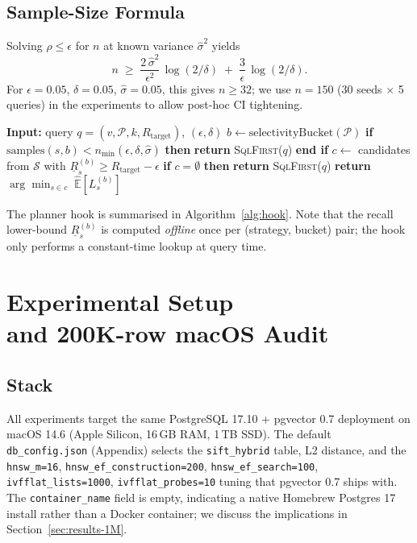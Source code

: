 \documentclass[conference]{IEEEtran}
\begin{document}
\subsection{Sample-Size Formula}
Solving $\rho \leq \epsilon$ for $n$ at known variance $\hat\sigma^2$
yields
\begin{equation}
  n \;\geq\; \frac{2\,\hat\sigma^2}{\epsilon^2}\,\log(2/\delta)
  \;+\; \frac{3}{\epsilon}\,\log(2/\delta).
  \label{eq:n}
\end{equation}
For $\epsilon = 0.05$, $\delta = 0.05$, $\hat\sigma = 0.05$, this
gives $n \geq 32$; we use $n = 150$ (30 seeds $\times$ 5 queries) in
the experiments to allow post-hoc CI tightening.

\begin{algorithm}[t]
\caption{PAC-Recall Planner Hook}
\label{alg:hook}
\begin{algorithmic}[1]
\STATE \textbf{Input:} query $q = (v, \mathcal{P}, k, R_{\text{target}})$, $(\epsilon, \delta)$
\STATE $b \gets \text{selectivityBucket}(\mathcal{P})$
\STATE \textbf{if} $\text{samples}(s, b) < n_{\min}(\epsilon, \delta, \hat\sigma)$ \textbf{then}
\STATE \quad \textbf{return} \textsc{SqlFirst}($q$) 
\STATE \textbf{end if}
\STATE $c \gets$ candidates from $\mathcal{S}$ with $\underline{R}_s^{(b)} \geq R_{\text{target}} - \epsilon$
\STATE \textbf{if} $c = \emptyset$ \textbf{then} \textbf{return} \textsc{SqlFirst}($q$)
\STATE \textbf{return} $\arg\min_{s \in c}\; \widehat{\mathbb{E}}[L_s^{(b)}]$
\end{algorithmic}
\end{algorithm}
The planner hook is summarised in Algorithm~\ref{alg:hook}.  Note
that the recall lower-bound $\underline{R}_s^{(b)}$ is computed
\emph{offline} once per (strategy, bucket) pair; the hook only
performs a constant-time lookup at query time.

\section{Experimental Setup \\and 200K-row macOS Audit}
\label{sec:results-200K}

\subsection{Stack}
All experiments target the same PostgreSQL 17.10 + pgvector 0.7
deployment on macOS 14.6 (Apple Silicon, 16\,GB RAM, 1\,TB SSD).
The default \texttt{db\_config.json} (Appendix) selects the
\texttt{sift\_hybrid} table, L2 distance, and the
\texttt{hnsw\_m=16}, \texttt{hnsw\_ef\_construction=200},
\texttt{hnsw\_ef\_search=100}, \texttt{ivfflat\_lists=1000},
\texttt{ivfflat\_probes=10} tuning that pgvector 0.7 ships with.
The \texttt{container\_name} field is empty, indicating a native
Homebrew Postgres 17 install rather than a Docker container; we
discuss the implications in Section~\ref{sec:results-1M}.
\end{document}
